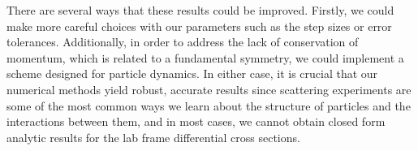 There are several ways that these results could be improved.
Firstly, we could make more careful choices with our parameters such as the step sizes or error tolerances.
Additionally, in order to address the lack of conservation of momentum, which is related to a fundamental symmetry, we could implement a scheme designed for particle dynamics.
In either case, it is crucial that our numerical methods yield robust, accurate results since scattering experiments are some of the most common ways we learn about the structure of particles and the interactions between them, and in most cases, we cannot obtain closed form analytic results for the lab frame differential cross sections.


    


